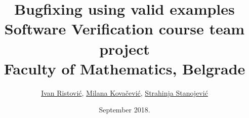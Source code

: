 \documentclass[a4paper]{article}
\begin{document}
\title{Bugfixing using valid examples\\ \small{Software Verification course team project\\Faculty of Mathematics, Belgrade}}

\author{\href{mailto:mi14031@matf.bg.ac.rs}{Ivan Ristović}, \href{mailto:mi14042@matf.bg.ac.rs}{Milana Kovačević}, \href{mailto:mi14207@matf.bg.ac.rs}{Strahinja Stanojević}}
\date{September 2018.}
\maketitle

\setcounter{tocdepth}{1}



\tableofcontents
\newpage





\appendix


\end{document}
